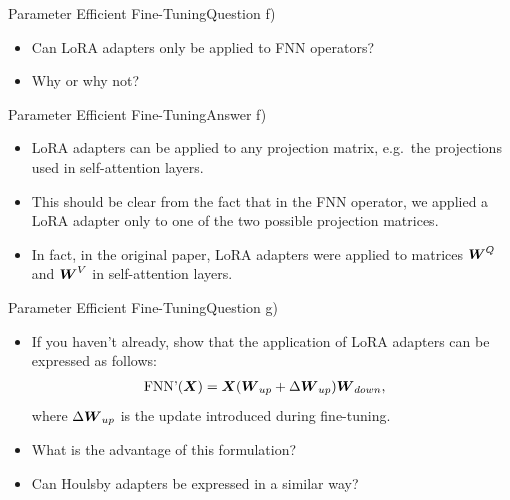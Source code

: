 \documentclass[t]{beamer}
\newcommand\op[1]{\operatorname{#1}}
\begin{document}
\begin{frame}{Parameter Efficient Fine-Tuning}{Question f)}
    \begin{itemize}
        \item Can LoRA adapters only be applied to FNN operators?
        \item Why or why not?
    \end{itemize}
\end{frame}

\begin{frame}{Parameter Efficient Fine-Tuning}{Answer f)}
    \begin{itemize}
        \item LoRA adapters can be applied to any projection matrix, e.g.\ the
              projections used in self-attention layers.
        \item This should be clear from the fact that in the FNN operator, we
              applied a LoRA adapter only to one of the two possible projection
              matrices.
        \item In fact, in the original paper, LoRA adapters were applied to
              matrices ${\boldsymbol{W}}^Q$ and ${\boldsymbol{W}}^V$ in self-attention layers.
    \end{itemize}
\end{frame}

\begin{frame}{Parameter Efficient Fine-Tuning}{Question g)}
    \begin{itemize}
        \item If you haven't already, show that the application of LoRA adapters
              can be expressed as follows:
              \begin{align}
                  \op{FNN'}(\mX) & = \mX(\mW_{up} + \Delta\mW_{up})\mW_{down},
              \end{align}
              where $\Delta{\boldsymbol{W}}_{up}$ is the update introduced during
              fine-tuning.
        \item What is the advantage of this formulation?
        \item Can Houlsby adapters be expressed in a similar way?
    \end{itemize}
\end{frame}
\end{document}

